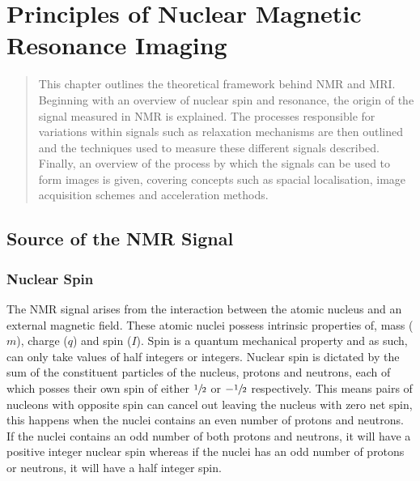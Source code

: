 \chapter{Principles of Nuclear Magnetic Resonance Imaging}
\label{chap:Theory}
\newpage
\begin{abstract}
	This chapter outlines the theoretical framework behind \ac{NMR} and \ac{MRI}. Beginning with an overview of nuclear spin and resonance, the origin of the signal measured in \ac{NMR} is explained. The processes responsible for variations within signals such as relaxation mechanisms are then outlined and the techniques used to measure these different signals described. Finally, an overview of the process by which the signals can be used to form images is given, covering concepts such as spacial localisation, image acquisition schemes and acceleration methods.
\end{abstract}
\newpage

\acresetall
\section{Source of the NMR Signal}
\label{sec:theory_source_of_nmr}

\subsection{Nuclear Spin}
\label{subsec:theory_nuclear_spin}
The \ac{NMR} signal arises from the interaction between the atomic nucleus and an external magnetic field. These atomic nuclei possess intrinsic properties of, mass ($m$), charge ($q$) and spin ($I$). Spin is a quantum mechanical property and as such, can only take values of half integers or integers. Nuclear spin is dictated by the sum of the constituent particles of the nucleus, protons and neutrons, each of which posses their own spin of either $\sfrac{1}{2}$ or $-\sfrac{1}{2}$ respectively. This means pairs of nucleons with opposite spin can cancel out leaving the nucleus with zero net spin, this happens when the nuclei contains an even number of protons and neutrons. If the nuclei contains an odd number of both protons and neutrons, it will have a positive integer nuclear spin whereas if the nuclei has an odd number of protons or neutrons, it will have a half integer spin. 


